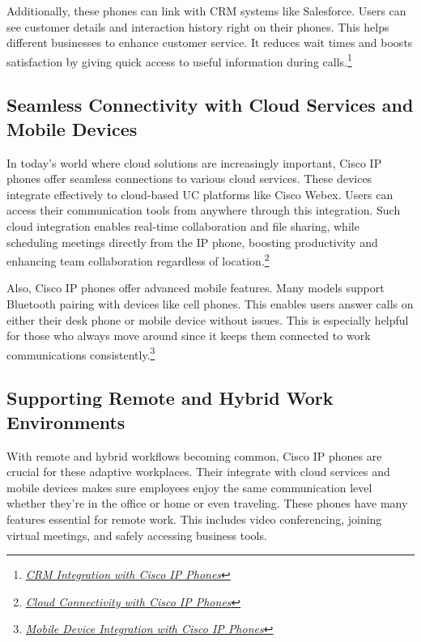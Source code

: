 \documentclass[11pt,a4paper]{article}
\begin{document}
Additionally, these phones can link with CRM systems like Salesforce. Users can see customer details and interaction history right on their phones. This helps different businesses to enhance customer service. It reduces wait times and boosts satisfaction by giving quick access to useful information during calls.\footnote{\href{https://www.cisco.com/c/dam/en/us/td/docs/voice_ip_comm/cucallconnectors/UCC_for_MS_CRM/Rel_30/marketing_source/30mkting.pdf}{\textit{CRM Integration with Cisco IP Phones}}}

\subsection*{Seamless Connectivity with Cloud Services and Mobile Devices}

In today’s world where cloud solutions are increasingly important, Cisco IP phones offer seamless connections to various cloud services. These devices integrate effectively to cloud-based UC platforms like Cisco Webex. Users can access their communication tools from anywhere through this integration. Such cloud integration enables real-time collaboration and file sharing, while scheduling meetings directly from the IP phone, boosting productivity and enhancing team collaboration regardless of location.\footnote{\href{https://www.cisco.com/c/en/us/products/unified-communications/webex-calling/index.html}{\textit{Cloud Connectivity with Cisco IP Phones}}}

Also, Cisco IP phones offer advanced mobile features. Many models support Bluetooth pairing with devices like cell phones. This enables users answer calls on either their desk phone or mobile device without issues. This is especially helpful for those who always move around since it keeps them connected to work communications consistently.\footnote{\href{https://www.cisco.com/c/en/us/support/docs/smb/collaboration-endpoints/cisco-ip-phone-8800-series/smb5670-configure-a-mobile-device-with-cisco-ip-phone-8800-series-mu.pdf}{\textit{Mobile Device Integration with Cisco IP Phones}}}


\subsection*{Supporting Remote and Hybrid Work Environments}

With remote and hybrid workflows becoming common, Cisco IP phones are crucial for these adaptive workplaces. Their integrate with cloud services and mobile devices makes sure employees enjoy the same communication level whether they're in the office or home or even traveling. These phones have many features essential for remote work. This includes video conferencing, joining virtual meetings, and safely accessing business tools.
\end{document}
